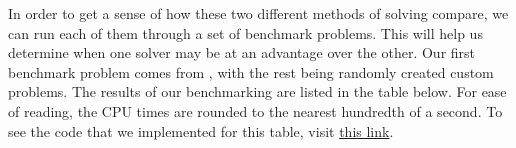 		In order to get a sense of how these two different methods of solving compare, we can run each of them through a set of benchmark problems. This will help us determine when one solver may be at an advantage over the other. Our first benchmark problem comes from \cite{BlekhermanGrigoriy;ParriloPabloA.;Thomas2013}, with the rest being randomly created custom problems. The results of our benchmarking are listed in the table below. For ease of reading, the CPU times are rounded to the nearest hundredth of a second. To see the code that we implemented for this table, visit \href{https://github.com/Dracoback/Polynomial-Optimization-using-Semidefinite-Programming/tree/master/Benchmark\%20Problems}{this link}.
		
		

